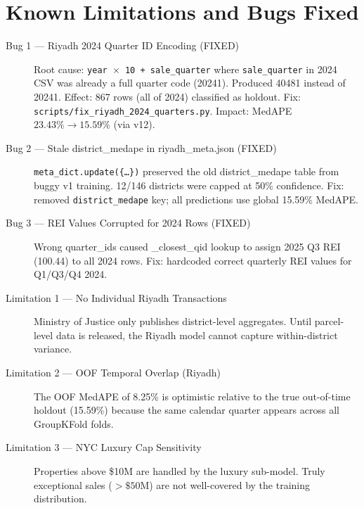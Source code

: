 \documentclass[11pt, a4paper, twoside]{report}
\begin{document}
\chapter{Known Limitations and Bugs Fixed}
\label{ch:bugs}

\begin{description}
  \item[Bug 1 --- Riyadh 2024 Quarter ID Encoding (FIXED)] Root cause:
        \texttt{year $\times$ 10 + sale\_quarter} where \texttt{sale\_quarter}
        in 2024 CSV was already a full quarter code (20241). Produced 40481
        instead of 20241. Effect: 867 rows (all of 2024) classified as holdout.
        Fix: \texttt{scripts/fix\_riyadh\_2024\_quarters.py}.
        Impact: MedAPE $23.43\% \to 15.59\%$ (via v12).

  \item[Bug 2 --- Stale district\_medape in riyadh\_meta.json (FIXED)]
        \texttt{meta\_dict.update(\{\ldots\})} preserved the old district\_medape
        table from buggy v1 training. 12/146 districts were capped at 50\%
        confidence. Fix: removed \texttt{district\_medape} key; all predictions
        use global 15.59\% MedAPE.

  \item[Bug 3 --- REI Values Corrupted for 2024 Rows (FIXED)] Wrong quarter\_ids
        caused \_closest\_qid lookup to assign 2025 Q3 REI (100.44) to all 2024
        rows. Fix: hardcoded correct quarterly REI values for Q1/Q3/Q4 2024.

  \item[Limitation 1 --- No Individual Riyadh Transactions] Ministry of Justice
        only publishes district-level aggregates. Until parcel-level data is
        released, the Riyadh model cannot capture within-district variance.

  \item[Limitation 2 --- OOF Temporal Overlap (Riyadh)] The OOF MedAPE of 8.25\%
        is optimistic relative to the true out-of-time holdout (15.59\%) because
        the same calendar quarter appears across all GroupKFold folds.

  \item[Limitation 3 --- NYC Luxury Cap Sensitivity] Properties above \$10M
        are handled by the luxury sub-model. Truly exceptional sales
        ($> \$50$M) are not well-covered by the training distribution.
\end{description}

\end{document}
